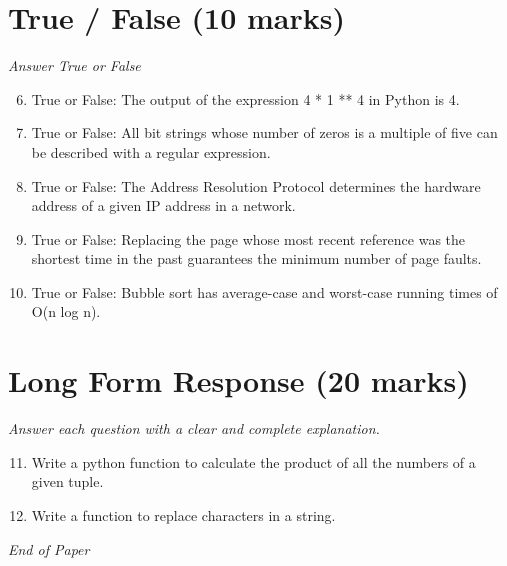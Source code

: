 \documentclass[12pt]{article}
\begin{document}
\section*{True / False (10 marks)}
\textit{Answer True or False}
\begin{enumerate}[label=\arabic*.]
\setcounter{enumi}{5}
\item True or False: The output of the expression 4 * 1 ** 4 in Python is 4.
\item True or False: All bit strings whose number of zeros is a multiple of five can be described with a regular expression.
\item True or False: The Address Resolution Protocol determines the hardware address of a given IP address in a network.
\item True or False: Replacing the page whose most recent reference was the shortest time in the past guarantees the minimum number of page faults.
\item True or False: Bubble sort has average-case and worst-case running times of O(n log n).
\end{enumerate}

\section*{Long Form Response (20 marks)}
\textit{Answer each question with a clear and complete explanation.}
\begin{enumerate}[label=\arabic*.]
\setcounter{enumi}{10}
\item Write a python function to calculate the product of all the numbers of a given tuple.
\item Write a function to replace characters in a string.
\end{enumerate}

\vfill
\noindent\textit{End of Paper}
\end{document}
